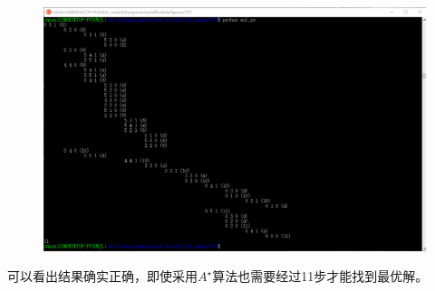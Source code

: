 \documentclass[a4paper, 11pt]{article}
\begin{document}
\begin{answer}
\begin{figure}[H]
\includegraphics[width=\linewidth]{fig/program.png}
\end{figure}
可以看出结果确实正确，即使采用$A^\star$算法也需要经过11步才能找到最优解。
\end{answer}
\end{document}
